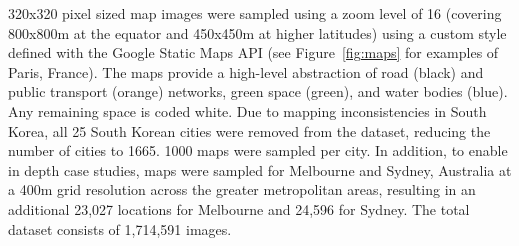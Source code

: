 \documentclass{nature}
\begin{document}
320x320 pixel sized map images were sampled using a zoom level of 16 (covering 800x800m at the equator and 450x450m at higher latitudes) using a custom style defined with the Google Static Maps API\cite{GoogleStatic2017} (see Figure~\ref{fig:maps} for examples of Paris, France). The maps provide a high-level abstraction of road (black) and public transport (orange) networks, green space (green), and water bodies (blue). Any remaining space is coded white. Due to mapping inconsistencies in South Korea, all 25 South Korean cities were removed from the dataset, reducing the number of cities to 1665. 1000 maps were sampled per city. In addition, to enable in depth case studies, maps were sampled for Melbourne and Sydney, Australia at a 400m grid resolution across the greater metropolitan areas, resulting in an additional 23,027 locations for Melbourne and 24,596 for Sydney. The total dataset consists of 1,714,591 images.
\end{document}
